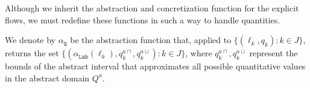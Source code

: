 \documentclass{llncs}
\newcommand{\blangle}{\big\langle}
\newcommand{\brangle}{\big\rangle}
\begin{document}
%


Although we inherit the abstraction and concretization function for the explicit flows, we must redefine these functions in such a way to handle quantities. 

\begin{definition}\label{quant_abs_funct}	
We denote by $\alpha_{\mathtt{Q}}$ be the abstraction function that, applied to $\{(\ell_k, q_k): k \in J\}$, returns the set $\{(\alpha_{\mathtt{Lab}}(\ell_k), q_k^{a\sqcap}, q_k^{a\sqcup}): k \in J\}$, 
where $q_k^{a\sqcap}, q_k^{a\sqcup}$ represent the bounds of the abstract interval that approximates all possible quantitative values in the abstract domain $Q^a$.
\end{definition} 
\end{document}
